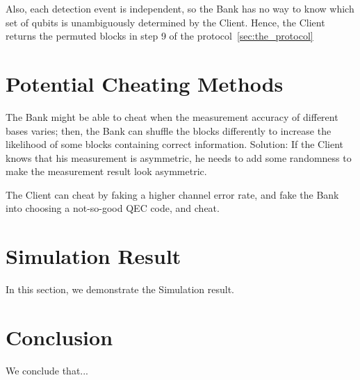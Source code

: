 \documentclass[%
 reprint,
superscriptaddress,
 amsmath,amssymb,
 aps,
]{revtex4-2}
\begin{document}
Also, each detection event is independent, so the Bank has no way to know which set of qubits is unambiguously determined by the Client. Hence, the Client returns the permuted blocks in step 9 of the protocol~\ref{sec:the_protocol}

\section{Potential Cheating Methods}
\label{sec:potential_cheating}

The Bank might be able to cheat when the measurement accuracy of different bases varies; then, the Bank can shuffle the blocks differently to increase the likelihood of some blocks containing correct information. Solution: If the Client knows that his measurement is asymmetric, he needs to add some randomness to make the measurement result look asymmetric.

The Client can cheat by faking a higher channel error rate, and fake the Bank into choosing a not-so-good QEC code, and cheat.

\section{Simulation Result}
In this section, we demonstrate the Simulation result.

\section{Conclusion}
We conclude that...











\end{document}
